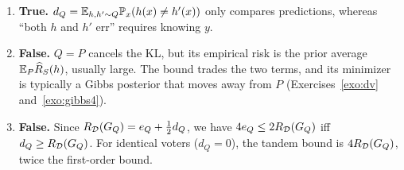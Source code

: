\documentclass[11pt]{article}
\newcounter{exo}
\begin{document}
\begin{solution}
\begin{enumerate}[label=(\alph*)]
      $\hat q$ close to $\frac12$ the two bounds nearly coincide.
\item \textbf{True.} $d_Q=\mathbb{E}_{h,h'\sim Q}\mathbb{P}_x(h(x)\neq h'(x))$ only compares predictions, whereas ``both $h$ and $h'$ err''
      requires knowing $y$.
\item \textbf{False.} $Q=P$ cancels the KL, but its empirical risk is the prior average $\mathbb{E}_P\widehat{R}_{S}(h)$, usually large.
      The bound trades the two terms, and its minimizer is typically a Gibbs posterior that moves away from $P$
      (Exercises~\ref{exo:dv} and~\ref{exo:gibbs4}).
\item \textbf{False.} Since $R_{\mathcal{D}}(G_{Q})=e_Q+\frac12d_Q$, we have $4e_Q\leq2R_{\mathcal{D}}(G_{Q})$ iff $d_Q\geq R_{\mathcal{D}}(G_{Q})$. For identical
      voters ($d_Q=0$), the tandem bound is $4R_{\mathcal{D}}(G_{Q})$, twice the first-order bound.
\end{enumerate}
\end{solution}
\end{document}

